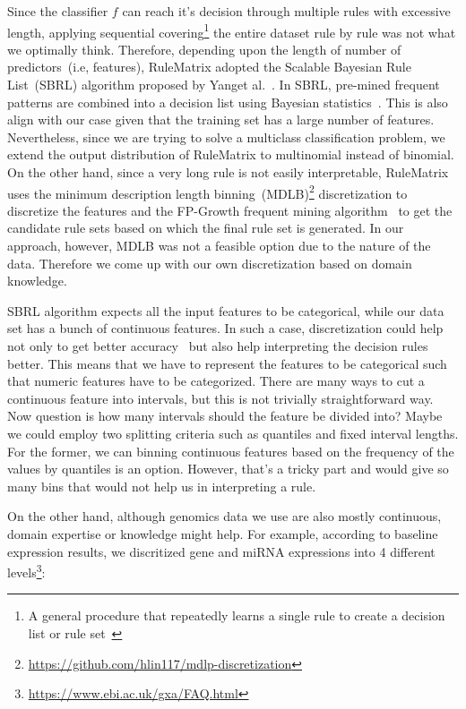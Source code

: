 \hspace*{3.5mm} Since the classifier $f$ can reach it's decision through multiple rules with excessive length, applying sequential covering\footnote{A general procedure that repeatedly learns a single rule to create a decision list or rule set~\cite{molnar2019interpretable}} the entire dataset rule by rule was not what we optimally think. Therefore, depending upon the length of number of predictors~(i.e, features), RuleMatrix adopted the Scalable Bayesian Rule List~(SBRL) algorithm proposed by Yanget al.~\cite{BayesianRule}. In SBRL, pre-mined frequent patterns are combined into a decision list using Bayesian statistics~\cite{molnar2019interpretable}. 
This is also align with our case given that the training set has a large number of features. Nevertheless, since we are trying to solve a multiclass classification problem, we extend the output distribution of RuleMatrix to multinomial instead of binomial. On the other hand, since a very long rule is not easily interpretable, RuleMatrix uses the minimum description length binning~(MDLB)\footnote{\url{https://github.com/hlin117/mdlp-discretization}} discretization to discretize the features and the FP-Growth frequent mining algorithm~\cite{han2000mining} to get the candidate rule sets based on which the final rule set is generated. In our approach, however, MDLB was not a feasible option due to the nature of the data. Therefore we come up with our own discretization based on domain knowledge.

\hspace*{3.5mm} SBRL algorithm expects all the input features to be categorical, while our data set has a bunch of continuous features. In such a case, discretization could help not only to get better accuracy~\cite{maslove2013discretization} but also help interpreting the decision rules better. This means that we have to represent the features to be categorical such that numeric features have to be categorized. There are many ways to cut a continuous feature into intervals, but this is not trivially straightforward way. Now question is how many intervals should the feature be divided into? Maybe we could employ two splitting criteria such as quantiles and fixed interval lengths. For the former, we can binning continuous features based on the frequency of the values by quantiles is an option. However, that's a tricky part and would give so many bins that would not help us in interpreting a rule. 

\hspace*{3.5mm} On the other hand, although genomics data we use are also mostly continuous, domain expertise or knowledge might help. For example, according to baseline expression results, we discritized gene and miRNA expressions into 4 different levels\footnote{\url{https://www.ebi.ac.uk/gxa/FAQ.html}}:

